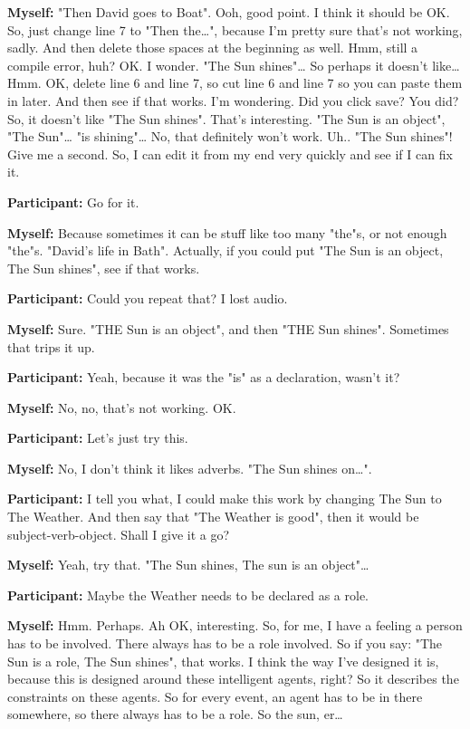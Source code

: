 \documentclass[11pt]{report}
\newcommand{\llabel}[1]{\hypertarget{llineno:#1}{\linelabel{#1}}}
\begin{document}
\begin{linenumbers}
\textbf{Myself:} "Then David goes to Boat". Ooh, good point. I think it should be OK. So, just change line 7 to "Then the\ldots{}", because I'm pretty sure that's not working, sadly. And then delete those spaces at the beginning as well. Hmm, still a compile error, huh? OK. I wonder. "The Sun shines"\ldots{} So perhaps it doesn't like\ldots{} Hmm. OK, delete line 6 and line 7, so cut line 6 and line 7 so you can paste them in later. And then see if that works. I'm wondering. Did you click save? You did? So, it doesn't like "The Sun shines". That's interesting. "The Sun is an object", "The Sun"\ldots{} "is shining"\ldots{} No, that definitely won't work. Uh.. "The Sun shines"! Give me a second. So, I can edit it from my end very quickly and see if I can fix it.

\textbf{Participant:} Go for it.

\textbf{Myself:} Because sometimes it can be stuff like too many "the"s, or not
enough "the"s. "David's life in Bath". Actually, if you could put "The Sun is an
object, The Sun shines", see if that works.\llabel{lne:syntax3b2}

\textbf{Participant:} Could you repeat that? I lost audio.

\textbf{Myself:} Sure. "THE Sun is an object", and then "THE Sun shines". Sometimes that trips it up.

\textbf{Participant:} Yeah, because it was the "is" as a declaration, wasn't it?

\textbf{Myself:} No, no, that's not working. OK.

\textbf{Participant:} Let's just try this.

\textbf{Myself:} No, I don't think it likes adverbs. "The Sun shines on\ldots{}".

\textbf{Participant:} I tell you what, I could make this work by changing The Sun to The Weather. And then say that "The Weather is good", then it would be subject-verb-object. Shall I give it a go?

\textbf{Myself:} Yeah, try that. "The Sun shines, The sun is an object"\ldots{}

\textbf{Participant:} Maybe the Weather needs to be declared as a role.

\textbf{Myself:} Hmm. Perhaps. Ah OK, interesting. So, for me, I have a feeling
a person has to be involved. There always has to be a role involved. So if you
say: "The Sun is a role, The Sun shines", that works. I think the way I've
designed it is, because this is designed around these intelligent agents, right?
So it describes the constraints on these agents. So for every event, an agent
has to be in there somewhere, so there always has to be a role. So the sun,
er\ldots{}\llabel{lne:feature6b}


\end{linenumbers}
\end{document}
